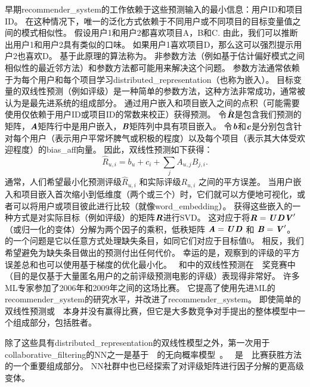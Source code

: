早期\gls{recommender_system}的工作依赖于这些预测输入的最小信息：用户ID和项目ID。
在这种情况下，唯一的泛化方式依赖于不同用户或不同项目的目标变量值之间的模式相似性。
假设用户1和用户2都喜欢项目A，B和C.
由此，我们可以推断出用户1和用户2具有类似的口味。
如果用户1喜欢项目D，那么这可以强烈提示用户2也喜欢D。
基于此原理的算法称为。
非参数方法（例如基于估计偏好模式之间相似性的最近邻方法）和参数方法都可能用来解决这个问题。
参数方法通常依赖于为每个用户和每个项目学习\gls{distributed_representation}（也称为嵌入）。
目标变量的双线性预测（例如评级）是一种简单的参数方法，这种方法非常成功，通常被认为是最先进系统的组成部分。
通过用户嵌入和项目嵌入之间的点积（可能需要使用仅依赖于用户ID或项目ID的常数来校正）获得预测。
令$\hat{\boldsymbol{\mathit{R}}}$是包含我们预测的矩阵，$\boldsymbol{\mathit{A}}$矩阵行中是用户嵌入，$\boldsymbol{\mathit{B}}$矩阵列中具有项目嵌入。
令$\boldsymbol{\mathit{b}}$和$\boldsymbol{\mathit{c}}$是分别包含针对每个用户（表示用户平常坏脾气或积极的程度）以及每个项目（表示其大体受欢迎程度）的\gls{bias_aff}向量。
因此，双线性预测如下获得：
\begin{equation}
\label{eq:bilinear-prediction}
 \hat{R}_{u,i} = b_u + c_i + \sum_j A_{u,j} B_{j,i}.
\end{equation}
通常，人们希望最小化预测评级$\hat{R}_{u,i}$ 和实际评级${R}_{u,i}$ 之间的平方误差。
当用户嵌入和项目嵌入首次缩小到低维度（两个或三个）时，它们就可以方便地可视化，或者可以将用户或项目彼此进行比较（就像\gls{word_embedding}）。
获得这些嵌入的一种方式是对实际目标（例如评级）的矩阵$\boldsymbol{\mathit{R}}$进行\gls{SVD}。
这对应于将$\boldsymbol{\mathit{R}} = \boldsymbol{\mathit{U}} \boldsymbol{\mathit{D}} \boldsymbol{\mathit{V}}'$（或归一化的变体）分解为两个因子的乘积，低秩矩阵 $\boldsymbol{\mathit{A}}=\boldsymbol{\mathit{U}} \boldsymbol{\mathit{D}}$ 和 $\boldsymbol{\mathit{B}} = \boldsymbol{\mathit{V}}'$。
的一个问题是它以任意方式处理缺失条目，如同它们对应于目标值0。
相反，我们希望避免为缺失条目做出的预测付出任何代价。
幸运的是，观察到的评级的平方误差总和也可以使用基于梯度的优化最小化。
~和中的双线性预测在~~奖竞赛中（目的是仅基于大量匿名用户的之前评级预测电影的评级）表现得非常好\citep{bennett2007netflix}。
许多\gls{ML}专家参加了2006年和2009年之间的这场比赛。
它提高了使用先进\gls{ML}的\gls{recommender_system}的研究水平，并改进了\gls{recommender_system}。
即使简单的双线性预测或~~本身并没有赢得比赛，但它是大多数竞争对手提出的整体模型中一个组成部分，包括胜者\citep{BigChaos-Netflix2009,Koren09}。


除了这些具有\gls{distributed_representation}的双线性模型之外，第一次用于\gls{collaborative_filtering}的\gls{NN}之一是基于~~的无向概率模型~\citep{Salakhutdinov-2007-short}。
~是~~比赛获胜方法的一个重要组成部分\citep{BigChaos-Netflix2009,Koren09}。
\gls{NN}社群中也已经探索了对评级矩阵进行因子分解的更高级变体\citep{Salakhutdinov2008-small}。

